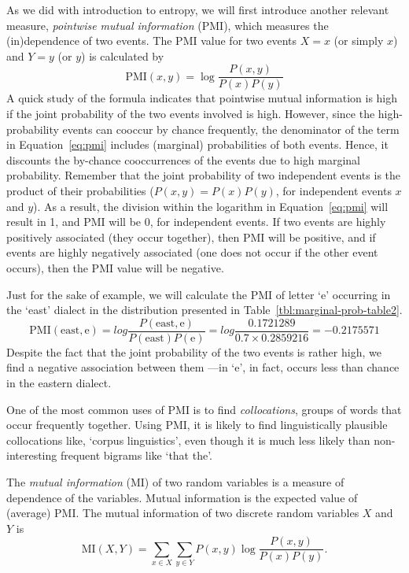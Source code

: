 As we did with introduction to entropy,
we will first introduce another relevant measure,
\emph{pointwise mutual information} (PMI),
which measures the (in)dependence of two events.
The PMI value for two events
$X = x$ (or simply $x$) and $Y = y$ (or $y$) is calculated by
\begin{equation}\label{eq:pmi}
  \text{PMI}(x, y) = \log \frac{P(x,y)}{P(x)P(y)}
\end{equation}
A quick study of the formula indicates
that pointwise mutual information is high
if the joint probability of the two events involved is high.
However,
since the high-probability events can cooccur by chance frequently,
the denominator of the term in Equation~\ref{eq:pmi} includes
(marginal) probabilities of both events.
Hence, it discounts the by-chance cooccurrences of the events
due to high marginal probability.
Remember that the joint probability of two independent events is
the product of their probabilities ($P(x,y) = P(x) P(y)$,
for independent events $x$ and $y$).
As a result,
the division within the logarithm in Equation~\ref{eq:pmi} will result in \num{1},
and PMI will be \num{0}, for independent events.
If two events are highly positively associated (they occur together),
then PMI will be positive,
and if events are highly negatively associated
(one does not occur if the other event occurs),
then the PMI value will be negative.

Just for the sake of example,
we will calculate the PMI of letter `e' occurring in the `east' dialect
in the distribution presented in Table~\ref{tbl:marginal-prob-table2}.
\[
  \text{PMI}(\text{east},\text{e})
    = log \frac{P(\text{east}, \text{e})}{P(\text{east})P(\text{e})}
    = log \frac{\num{0.1721289}}{\num{0.7}\times \num{0.2859216}}
    = \num{-0.2175571}
\]
Despite the fact that the joint probability of the two events is rather high,
we find a negative association between them%
---in `e', in fact, occurs less than chance in the eastern dialect.

One of the most common uses of PMI is to find \emph{collocations},
groups of words that occur frequently together.
Using PMI,
it is likely to find linguistically plausible collocations like,
`corpus linguistics',
even though it is much less likely than non-interesting frequent bigrams like `that the'.

The \emph{mutual information} (MI) of two random variables
is a measure of dependence of the variables.
Mutual information is the expected value of (average) PMI.
The mutual information of two discrete random variables $X$ and $Y$ is
\begin{equation}\label{eq:mi}
  \text{MI}(X, Y) 
    = \sum_{x\in X} \sum_{y\in Y} P(x,y) \log \frac{P(x,y)}{P(x)P(y)} .
\end{equation}


